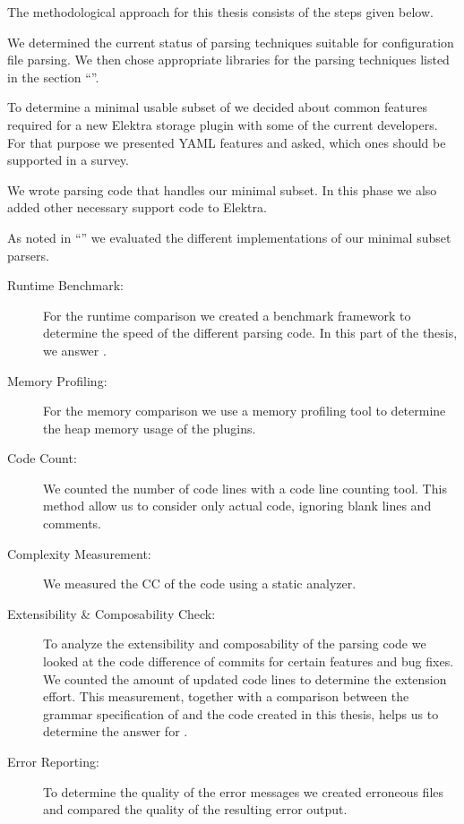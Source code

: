 The methodological approach for this thesis consists of the steps given below.

\begin{description}[style=multiline, leftmargin=3.2cm, font=\bfseries]

  \item[Literature Review] We determined the current status of parsing techniques suitable for configuration file parsing. We then chose appropriate libraries for the parsing techniques listed in the section “”.

  \item[Discussion] To determine a minimal usable subset of  we decided about common features required for a new Elektra storage plugin with some of the current developers. For that purpose we presented YAML features and asked, which ones should be supported in a survey.

  \item[Implementation] We wrote parsing code that handles our minimal  subset. In this phase we also added other necessary support code to Elektra.

  \item[Comparison] As noted in “” we evaluated the different implementations of our minimal  subset parsers.

  \begin{description}
    \item[Runtime Benchmark:] For the runtime comparison we created a benchmark framework to determine the speed of the different parsing code. In this part of the thesis, we answer .

    \item[Memory Profiling:] For the memory comparison we use a memory profiling tool to determine the heap memory usage of the  plugins.

    \item[Code Count:] We counted the number of code lines with a code line counting tool. This method allow us to consider only actual code, ignoring blank lines and comments.

    \item[Complexity Measurement:] We measured the \gls{CC} of the code using a static analyzer.

    \item[Extensibility \& Composability Check:] To analyze the extensibility and composability of the parsing code we looked at the code difference of commits for certain features and bug fixes. We counted the amount of updated code lines to determine the extension effort. This measurement, together with a comparison between the grammar specification of  and the code created in this thesis, helps us to determine the answer for .

    \item[Error Reporting:] To determine the quality of the error messages we created erroneous files and compared the quality of the resulting error output.
  \end{description}

\end{description}

